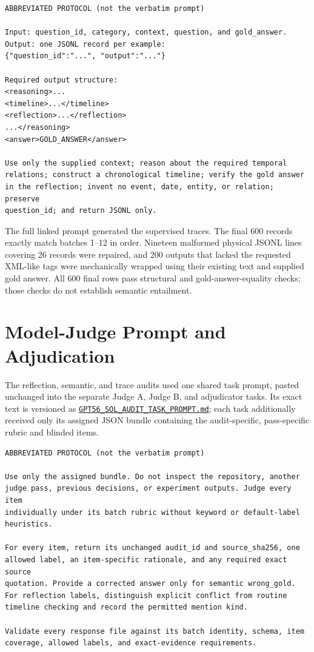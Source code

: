 \documentclass[conference]{IEEEtran}
\begin{document}
\begin{lstlisting}[style=prompt]
ABBREVIATED PROTOCOL (not the verbatim prompt)

Input: question_id, category, context, question, and gold_answer.
Output: one JSONL record per example:
{"question_id":"...", "output":"..."}

Required output structure:
<reasoning>...
<timeline>...</timeline>
<reflection>...</reflection>
...</reasoning>
<answer>GOLD_ANSWER</answer>

Use only the supplied context; reason about the required temporal
relations; construct a chronological timeline; verify the gold answer
in the reflection; invent no event, date, entity, or relation; preserve
question_id; and return JSONL only.
\end{lstlisting}

The full linked prompt generated the supervised traces. The final 600 records exactly match batches 1--12 in order. Nineteen malformed physical JSONL lines covering 26 records were repaired, and 200 outputs that lacked the requested XML-like tags were mechanically wrapped using their existing text and supplied gold answer. All 600 final rows pass structural and gold-answer-equality checks; those checks do not establish semantic entailment.
\section{Model-Judge Prompt and Adjudication}
\label{app:model-judge-audits}

The reflection, semantic, and trace audits used one shared task prompt, pasted unchanged into the separate Judge A, Judge B, and adjudicator tasks. Its exact text is versioned as
\href{https://github.com/thestbobo/tiser_temporal_reasoning_extension/blob/main/docs/GPT56_SOL_AUDIT_TASK_PROMPT.md}{\texttt{GPT56\_SOL\_AUDIT\_TASK\_PROMPT.md}}; each task additionally received only its assigned JSON bundle containing the audit-specific, pass-specific rubric and blinded items.

\begin{lstlisting}[style=prompt]
ABBREVIATED PROTOCOL (not the verbatim prompt)

Use only the assigned bundle. Do not inspect the repository, another
judge pass, previous decisions, or experiment outputs. Judge every item
individually under its batch rubric without keyword or default-label
heuristics.

For every item, return its unchanged audit_id and source_sha256, one
allowed label, an item-specific rationale, and any required exact source
quotation. Provide a corrected answer only for semantic wrong_gold.
For reflection labels, distinguish explicit conflict from routine
timeline checking and record the permitted mention kind.

Validate every response file against its batch identity, schema, item
coverage, allowed labels, and exact-evidence requirements.
\end{lstlisting}
\end{document}
